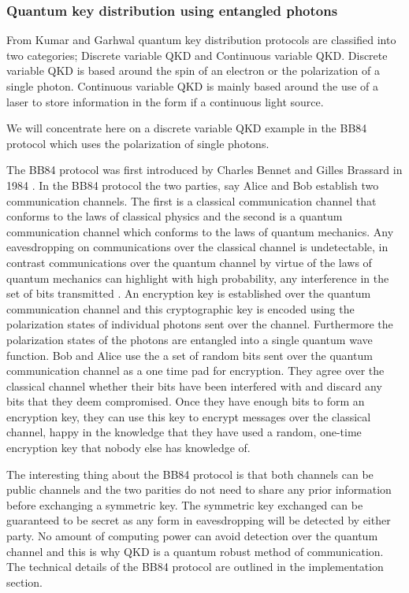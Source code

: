 \documentclass{article}
\begin{document}
\subsubsection{Quantum key distribution using entangled photons}
From Kumar and Garhwal \cite{Kumar2021State-of-the-ArtCryptography} quantum key distribution protocols are classified into two categories; Discrete variable QKD and Continuous variable QKD. Discrete variable QKD is based around the spin of an electron or the polarization of a single photon. Continuous variable QKD is mainly based around the use of a laser to store information in the form if a continuous light source.

We will concentrate here on a discrete variable QKD example in the BB84 protocol which uses the polarization of single photons.  

The BB84 protocol was first introduced by Charles Bennet and Gilles Brassard in 1984 \cite{Bennett2020QuantumTossing} . In the BB84 protocol the two parties, say Alice and Bob establish two communication channels. The first is a classical communication channel that conforms to the laws of classical physics and the second is a quantum communication channel which conforms to the laws of quantum mechanics. Any eavesdropping on communications over the classical channel is undetectable, in contrast communications over the quantum channel by virtue of the laws of quantum mechanics can highlight with high probability, any interference in the set of bits transmitted . An encryption key is established over the quantum communication channel and this cryptographic key is encoded using the polarization states of individual photons sent over the channel. Furthermore the polarization states of the photons are entangled into a single quantum wave function. Bob and Alice use the a set of random bits sent over the quantum communication channel as a one time pad for encryption. They agree over the classical channel whether their bits have been interfered with and discard any bits that they deem compromised. Once they have enough bits to form an encryption key, they can use this key to encrypt messages over the classical channel, happy in the knowledge that they have used a random, one-time encryption key that nobody else has knowledge of.

The interesting thing about the BB84 protocol is that both channels can be public channels and the two parities do not need to share any prior information before exchanging a symmetric key. The symmetric key exchanged can be guaranteed to be  secret as any form in eavesdropping will be detected by either party. No amount of computing power can avoid detection over the quantum channel and this is why QKD is a quantum robust method of communication. The technical details of the BB84 protocol are outlined in the implementation section.
\end{document}
